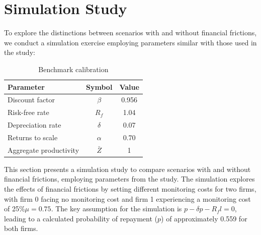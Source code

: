 \documentclass[12pt]{report}
\begin{document}
\section{Simulation Study}

To explore the distinctions between scenarios with and without financial frictions, we conduct a simulation exercise
employing  parameters similar with those used in the \cite{OsePap17} study:

\begin{table}[H]
    \centering
    \begin{tabular}{lcc}
    \hline Parameter & Symbol & Value \\
    \hline \hline
    Discount factor & $\beta$ & 0.956 \\
    Risk-free rate & $R_f$ & 1.04 \\
    Depreciation rate & $\delta$ & 0.07 \\
    Returns to scale & $\alpha$ & 0.70 \\
    Aggregate productivity & $\bar{Z}$ & 1 \\
    \hline
    \end{tabular}
    \caption{Benchmark calibration}
\end{table}


This section presents a simulation study to compare scenarios with and without financial frictions, employing parameters
from the \cite{OsePap17} study. The simulation explores the effects of financial frictions by setting different
monitoring costs for two firms, with firm 0 facing no monitoring cost and firm 1 experiencing a monitoring cost of
25\%\(\mu =0.75 \).
The key assumption for the simulation is \( p - \delta p - R_f l = 0 \), leading to a calculated probability of
repayment (\(p\)) of approximately 0.559 for both firms.
\end{document}
